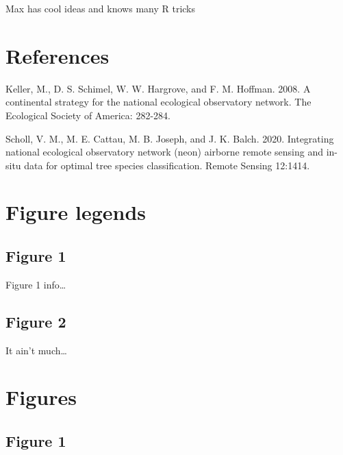 \documentclass[
]{article}
\begin{document}
Max has cool ideas and knows many R tricks

\newpage

\hypertarget{references}{%
\section{References}\label{references}}

\hypertarget{refs}{}
\leavevmode\hypertarget{ref-keller2008continental}{}%
Keller, M., D. S. Schimel, W. W. Hargrove, and F. M. Hoffman. 2008. A continental strategy for the national ecological observatory network. The Ecological Society of America: 282-284.

\leavevmode\hypertarget{ref-scholl2020integrating}{}%
Scholl, V. M., M. E. Cattau, M. B. Joseph, and J. K. Balch. 2020. Integrating national ecological observatory network (neon) airborne remote sensing and in-situ data for optimal tree species classification. Remote Sensing 12:1414.

\newpage

\clearpage

\hypertarget{figure-legends}{%
\section*{Figure legends}\label{figure-legends}}

\hypertarget{figure-1}{%
\subsection*{Figure 1}\label{figure-1}}

Figure 1 info\ldots{}

\hypertarget{figure-2}{%
\subsection*{Figure 2}\label{figure-2}}

It ain't much\ldots{}

\hypertarget{figures}{%
\section*{Figures}\label{figures}}

\hypertarget{figure-1-1}{%
\subsection*{Figure 1}\label{figure-1-1}}
\end{document}
